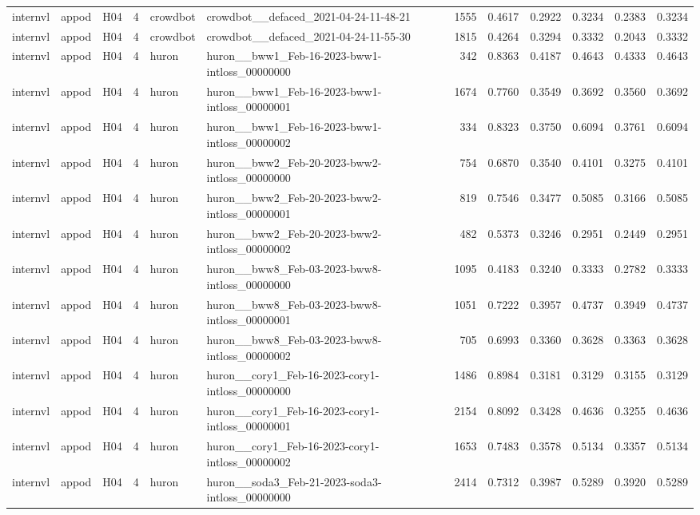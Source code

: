 \begin{table}[tbp]
\begin{tabular}{lllrllrrrrrr}
internvl & appod & H04 & 4 & crowdbot & crowdbot\_\_defaced\_2021-04-24-11-48-21 & 1555 & 0.4617 & 0.2922 & 0.3234 & 0.2383 & 0.3234 \\
internvl & appod & H04 & 4 & crowdbot & crowdbot\_\_defaced\_2021-04-24-11-55-30 & 1815 & 0.4264 & 0.3294 & 0.3332 & 0.2043 & 0.3332 \\
internvl & appod & H04 & 4 & huron & huron\_\_bww1\_Feb-16-2023-bww1-intloss\_00000000 & 342 & 0.8363 & 0.4187 & 0.4643 & 0.4333 & 0.4643 \\
internvl & appod & H04 & 4 & huron & huron\_\_bww1\_Feb-16-2023-bww1-intloss\_00000001 & 1674 & 0.7760 & 0.3549 & 0.3692 & 0.3560 & 0.3692 \\
internvl & appod & H04 & 4 & huron & huron\_\_bww1\_Feb-16-2023-bww1-intloss\_00000002 & 334 & 0.8323 & 0.3750 & 0.6094 & 0.3761 & 0.6094 \\
internvl & appod & H04 & 4 & huron & huron\_\_bww2\_Feb-20-2023-bww2-intloss\_00000000 & 754 & 0.6870 & 0.3540 & 0.4101 & 0.3275 & 0.4101 \\
internvl & appod & H04 & 4 & huron & huron\_\_bww2\_Feb-20-2023-bww2-intloss\_00000001 & 819 & 0.7546 & 0.3477 & 0.5085 & 0.3166 & 0.5085 \\
internvl & appod & H04 & 4 & huron & huron\_\_bww2\_Feb-20-2023-bww2-intloss\_00000002 & 482 & 0.5373 & 0.3246 & 0.2951 & 0.2449 & 0.2951 \\
internvl & appod & H04 & 4 & huron & huron\_\_bww8\_Feb-03-2023-bww8-intloss\_00000000 & 1095 & 0.4183 & 0.3240 & 0.3333 & 0.2782 & 0.3333 \\
internvl & appod & H04 & 4 & huron & huron\_\_bww8\_Feb-03-2023-bww8-intloss\_00000001 & 1051 & 0.7222 & 0.3957 & 0.4737 & 0.3949 & 0.4737 \\
internvl & appod & H04 & 4 & huron & huron\_\_bww8\_Feb-03-2023-bww8-intloss\_00000002 & 705 & 0.6993 & 0.3360 & 0.3628 & 0.3363 & 0.3628 \\
internvl & appod & H04 & 4 & huron & huron\_\_cory1\_Feb-16-2023-cory1-intloss\_00000000 & 1486 & 0.8984 & 0.3181 & 0.3129 & 0.3155 & 0.3129 \\
internvl & appod & H04 & 4 & huron & huron\_\_cory1\_Feb-16-2023-cory1-intloss\_00000001 & 2154 & 0.8092 & 0.3428 & 0.4636 & 0.3255 & 0.4636 \\
internvl & appod & H04 & 4 & huron & huron\_\_cory1\_Feb-16-2023-cory1-intloss\_00000002 & 1653 & 0.7483 & 0.3578 & 0.5134 & 0.3357 & 0.5134 \\
internvl & appod & H04 & 4 & huron & huron\_\_soda3\_Feb-21-2023-soda3-intloss\_00000000 & 2414 & 0.7312 & 0.3987 & 0.5289 & 0.3920 & 0.5289 \\

\end{tabular}
\end{table}
